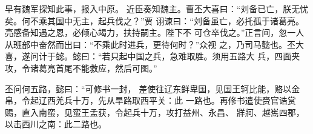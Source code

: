\documentclass[UTF8,12pt,twoside,a4paper]{ctexart} %
\begin{document}
早有魏军探知此事，报入中原。
近臣奏知魏主。曹丕大喜曰：“刘备已亡，朕无忧矣。何不乘其国中无主，起兵伐之？”贾
诩谏曰：“刘备虽亡，必托孤于诸葛亮。亮感备知遇之恩，必倾心竭力，扶持嗣主。陛下不
可仓卒伐之。”正言间，忽一人从班部中奋然而出曰：“不乘此时进兵，更待何时？”众视
之，乃司马懿也。丕大喜，遂问计于懿。懿曰：“若只起中国之兵，急难取胜。须用五路大
兵，四面夹攻，令诸葛亮首尾不能救应，然后可图。”

丕问何五路，懿曰：“可修书一封，
差使往辽东鲜卑国，见国王轲比能，赂以金帛，令起辽西羌兵十万，先从旱路取西平关：此
一路也。再修书遣使赍官诰赏赐，直入南蛮，见蛮王孟获，令起兵十万，攻打益州、永昌、
牂牁、越嶲四郡，以击西川之南：此二路也。

\clearpage{\pagestyle{empty}\cleardoublepage}%



	\begin{center}
	\end{center}
\vspace*{10pt}



\clearpage{\pagestyle{empty}\cleardoublepage}%



	\begin{center}
	\end{center}
\vspace*{10pt}

\begin{center}
\end{center}

\clearpage

\begin{center}
\end{center}
\clearpage{\pagestyle{empty}\cleardoublepage}%
\end{document}
